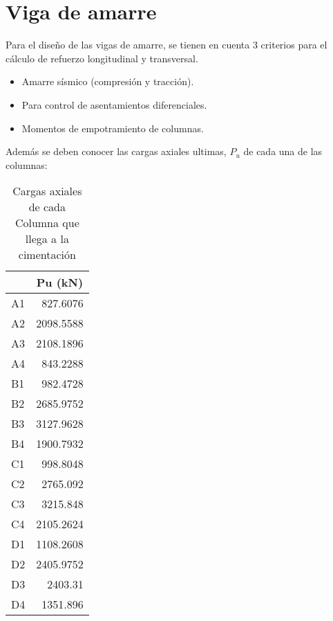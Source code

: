 \documentclass[12pt]{article}
\begin{document}
\section{Viga de amarre}
Para el diseño de las vigas de amarre, se tienen en cuenta 3 criterios para el cálculo de refuerzo longitudinal y transversal.
\begin{itemize}
    \item Amarre sísmico (compresión y tracción).
    \item Para control de asentamientos diferenciales.
    \item Momentos de empotramiento de columnas.
\end{itemize}
Además se deben conocer  las cargas axiales ultimas, $P_{u}$ de cada una de las columnas:
\begin{table}[H]
  \centering
    \begin{tabular}{|l|r|}
    \hline
    \rowcolor[rgb]{ 1,  .949,  .8} \multicolumn{1}{|c|}{\textbf{COLUMNA}} & \multicolumn{1}{c|}{\textbf{Pu (kN)}} \bigstrut\\
    \hline
    A1  & 827.6076 \bigstrut\\
    \hline
    A2  & 2098.5588 \bigstrut\\
    \hline
    A3  & 2108.1896 \bigstrut\\
    \hline
    A4  & 843.2288 \bigstrut\\
    \hline
    B1  & 982.4728 \bigstrut\\
    \hline
    B2  & 2685.9752 \bigstrut\\
    \hline
    B3  & 3127.9628 \bigstrut\\
    \hline
    B4  & 1900.7932 \bigstrut\\
    \hline
    C1  & 998.8048 \bigstrut\\
    \hline
    C2  & 2765.092 \bigstrut\\
    \hline
    C3  & 3215.848 \bigstrut\\
    \hline
    C4  & 2105.2624 \bigstrut\\
    \hline
    D1  & 1108.2608 \bigstrut\\
    \hline
    D2  & 2405.9752 \bigstrut\\
    \hline
    D3  & 2403.31 \bigstrut\\
    \hline
    D4  & 1351.896 \bigstrut\\
    \hline
    \end{tabular}%
    \caption{Cargas axiales de cada Columna que llega a la cimentación}
  \label{tab:cargascolumnas}%
\end{table}%
\end{document}
